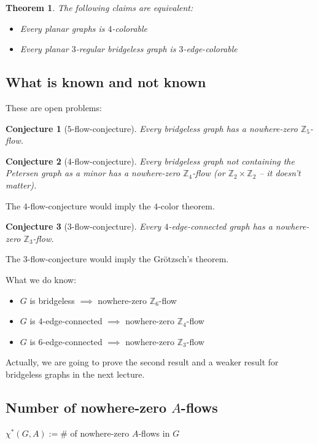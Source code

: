 \documentclass{article}
\newtheorem*{theorem}{Theorem}
\newtheorem*{conjecture}{Conjecture}
\newcommand{\Z}{\mathbb{Z}}
\begin{document}
\begin{theorem}
	The following claims are equivalent:
	\begin{itemize}
		\item Every planar graphs is $4$-colorable
		\item Every planar $3$-regular bridgeless graph is
			$3$-edge-colorable
	\end{itemize}
\end{theorem}

\subsection*{What is known and not known}
These are open problems:

\begin{conjecture}[$5$-flow-conjecture]
	Every bridgeless graph has a nowhere-zero $\Z_5$-flow.
\end{conjecture}

\begin{conjecture}[$4$-flow-conjecture]
	Every bridgeless graph not containing the Petersen graph as a minor has
	a nowhere-zero $\Z_4$-flow (or $\Z_2 \times \Z_2$ -- it doesn't
	matter).
\end{conjecture}

\noindent
The $4$-flow-conjecture would imply the $4$-color theorem.

\begin{conjecture}[$3$-flow-conjecture]
	Every $4$-edge-connected graph has a nowhere-zero $\Z_3$-flow.
\end{conjecture}

\noindent
The $3$-flow-conjecture would imply the Grötzsch's theorem.

\noindent
What we do know:
\begin{itemize}
	\item $G$ is bridgeless $\implies$ nowhere-zero $\Z_6$-flow
	\item $G$ is $4$-edge-connected $\implies$ nowhere-zero $\Z_4$-flow
	\item $G$ is $6$-edge-connected $\implies$ nowhere-zero $\Z_3$-flow
\end{itemize}

\noindent
Actually, we are going to prove the second result and a weaker result for
bridgeless graphs in the next lecture.

\subsection*{Number of nowhere-zero $A$-flows}
$\chi^*(G, A) := \#$ of nowhere-zero $A$-flows in $G$
\end{document}
